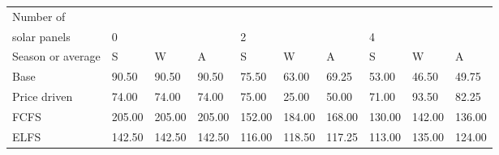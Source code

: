 \begin{table}[h] 
\centering 
\begin{tabular}{l|lll|lll|lll}Number of \\ solar panels&0& & &2& & &4& & \\ \hline 
Season or average & S & W & A & S & W & A & S & W & A \\ \hline 
Base&90.50&90.50&90.50&75.50&63.00&69.25&53.00&46.50&49.75 \\ 
Price driven&74.00&74.00&74.00&75.00&25.00&50.00&71.00&93.50&82.25 \\ 
FCFS&205.00&205.00&205.00&152.00&184.00&168.00&130.00&142.00&136.00 \\ 
ELFS&142.50&142.50&142.50&116.00&118.50&117.25&113.00&135.00&124.00 \\ 
\end{tabular} 
\end{table}